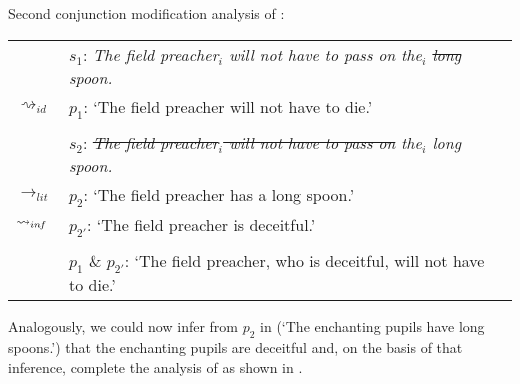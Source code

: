 \documentclass[output=paper]{langsci/langscibook}
\begin{document}
\ea \label{analysis quoted long spoon} 
Second conjunction modification analysis of : \\
\vspace{5pt}
\begin{tabular}{ll}
								& 	$s_{1}$: \hspace{4pt} \textit{The field preacher$_{i}$ will not have to pass on the$_{i}$ \sout{long} spoon.} \\
$\rightsquigarrow_{id}$				&	$p_{1}$: \hspace{1pt} `The field preacher will not have to die.' \\
\vspace{-5pt} \\
								& 	$s_{2}$: \hspace{4pt} \textit{\sout{The field preacher$_{i}$ will not have to pass on} the$_{i}$ long spoon.} \\
$\rightarrow_{lit}$					&	$p_{2}$: \hspace{1pt} `The field preacher has a long spoon.' \\
$\rightsquigarrow_{in\hspace{-0.8pt} f}$	&	$p_{2'}$: \hspace{-1.5pt} `The field preacher is deceitful.' \\
\vspace{-5pt} \\
								&	$p_{1}$ \& $p_{2'}$: `The field preacher, who is deceitful, will not have to die.' \\
\end{tabular}
\z

\noindent Analogously, we could now infer from $p_{2}$ in  (`The enchanting pupils have long spoons.') that the enchanting pupils are deceitful and, on the basis of that inference, complete the analysis of  as shown in .
\end{document}
